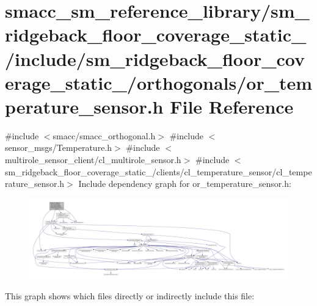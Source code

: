 \hypertarget{sm__ridgeback__floor__coverage__static__1_2include_2sm__ridgeback__floor__coverage__static__1_2o990ea2e343889fb8499938f92f5b3669}{}\section{smacc\+\_\+sm\+\_\+reference\+\_\+library/sm\+\_\+ridgeback\+\_\+floor\+\_\+coverage\+\_\+static\+\_/include/sm\+\_\+ridgeback\+\_\+floor\+\_\+coverage\+\_\+static\+\_/orthogonals/or\+\_\+temperature\+\_\+sensor.h File Reference}
\label{sm__ridgeback__floor__coverage__static__1_2include_2sm__ridgeback__floor__coverage__static__1_2o990ea2e343889fb8499938f92f5b3669}
{\ttfamily \#include $<$smacc/smacc\+\_\+orthogonal.\+h$>$}\newline
{\ttfamily \#include $<$sensor\+\_\+msgs/\+Temperature.\+h$>$}\newline
{\ttfamily \#include $<$multirole\+\_\+sensor\+\_\+client/cl\+\_\+multirole\+\_\+sensor.\+h$>$}\newline
{\ttfamily \#include $<$sm\+\_\+ridgeback\+\_\+floor\+\_\+coverage\+\_\+static\+\_/clients/cl\+\_\+temperature\+\_\+sensor/cl\+\_\+temperature\+\_\+sensor.\+h$>$}\newline
Include dependency graph for or\+\_\+temperature\+\_\+sensor.\+h\+:
\nopagebreak
\begin{figure}[H]
\begin{center}
\leavevmode
\includegraphics[width=350pt]{sm__ridgeback__floor__coverage__static__1_2include_2sm__ridgeback__floor__coverage__static__1_2ob59ae3d61a4d46c8c76a8c2b27943cb9}
\end{center}
\end{figure}
This graph shows which files directly or indirectly include this file\+:
